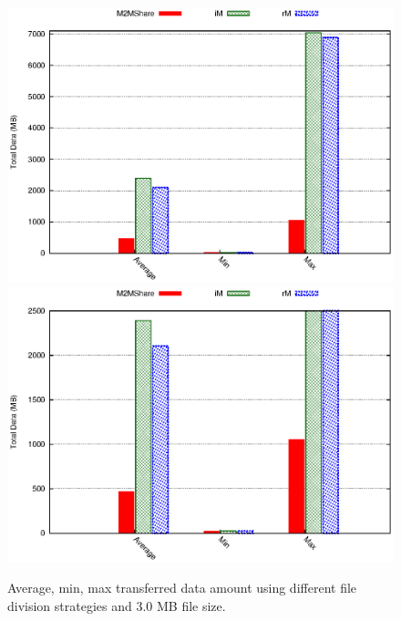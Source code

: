 \begin{figure}[htbp]
\centering%
\subfigure%
{\includegraphics{grafici/dataDFS_25MB.eps}}\qquad\qquad
\subfigure%
{\includegraphics{grafici/dataDFS_25MB_zoom.eps}}
\caption{Average, min, max transferred data amount using different file division strategies and 3.0 MB file size.\label{graficoDataFDS_25MB}}
\end{figure}

